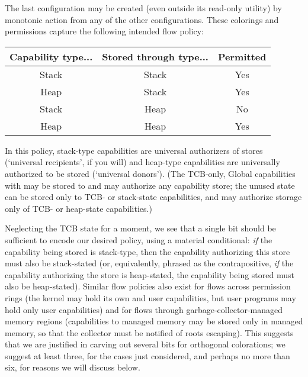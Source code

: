 The last configuration may be created (even outside its read-only utility)
by monotonic action from any of the other configurations.  These colorings
and permissions capture the following intended flow policy:

\begin{center}\begin{tabular}{ccc}
{\bf Capability type...} & {\bf Stored through type...} & {\bf Permitted} \\
\hline
Stack & Stack & Yes \\
Heap  & Stack & Yes \\
Stack & Heap  & No  \\
Heap  & Heap  & Yes \\
\end{tabular}\end{center}

In this policy, stack-type capabilities are universal authorizers of
stores (`universal recipients', if you will) and heap-type capabilities
are universally authorized to be stored (`universal donors').  (The
TCB-only, Global capabilities with \cappermSLC may be
stored to and may authorize any capability store; the unused state can be
stored only to TCB- or stack-state capabilities, and may authorize storage
only of TCB- or heap-state capabilities.)

Neglecting the TCB state for a moment, we see that a single bit should be
sufficient to encode our desired policy, using a material conditional:
\emph{if} the capability being stored is stack-type, then the capability
authorizing this store must also be stack-stated (or, equivalently, phrased
as the contrapositive, \emph{if} the capability authorizing the store is
heap-stated, the capability being stored must also be heap-stated). Similar
flow policies also exist for flows across permission rings (the kernel may
hold its own and user capabilities, but user programs may hold only user
capabilities) and for flows through garbage-collector-managed memory regions
(capabilities to managed memory may be stored only in managed memory,
so that the collector must be notified of roots escaping).  This suggests that we are justified in
carving out several bits for orthogonal colorations; we suggest at least
three, for the cases just considered, and perhaps no more than six, for
reasons we will discuss below.

